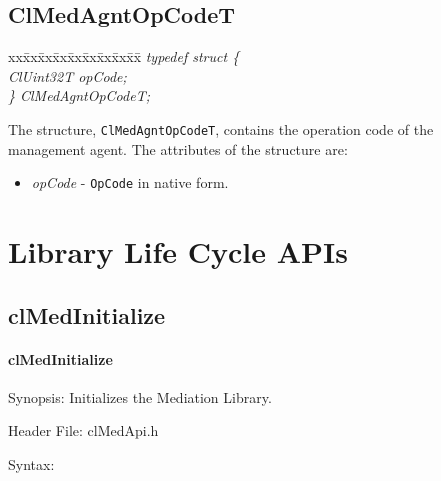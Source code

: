 \begin{flushleft}
\subsection{ClMedAgntOpCodeT}
\begin{tabbing}
xx\=xx\=xx\=xx\=xx\=xx\=xx\=xx\=xx\=\kill
\textit{typedef struct \{}\\
\>\>\>\>\textit{ClUint32T     opCode;}\\
\textit{\} ClMedAgntOpCodeT;}\end{tabbing}
The structure, {\tt{ClMedAgntOpCodeT}}, contains the operation code of the management agent. The attributes of the structure are:
\begin{itemize}
\item
\textit{opCode} - {\tt{OpCode}} in native form.
\end{itemize}




\newpage

\section{Library Life Cycle APIs}
\subsection{clMedInitialize}
\hypertarget{pagemed101}{}\paragraph{cl\-Med\-Initialize}\label{pagemed101}
\begin{Desc}
\item[Synopsis:]Initializes the Mediation Library.\end{Desc}
\begin{Desc}
\item[Header File:]clMedApi.h\end{Desc}
\begin{Desc}
\item[Syntax:]


\end{Desc}
\end{flushleft}
